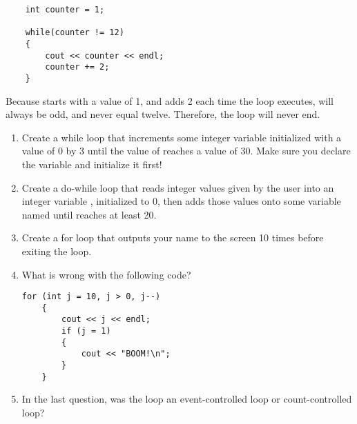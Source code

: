 \begin{lstlisting}
    int counter = 1;

    while(counter != 12)
    {
        cout << counter << endl;
        counter += 2;
    }
\end{lstlisting}

Because  starts with a value of 1, and adds 2 each time the loop executes,  will always be odd, and never equal twelve.
Therefore, the loop will never end.

\begin{enumerate}
\item Create a while loop that increments some integer variable  initialized with a value of 0 by 3 until the value of  reaches a value of 30.
Make sure you declare the variable and initialize it first! 

\item  Create a do-while loop that reads integer values given by the user into an integer variable , initialized to 0, then adds those values onto some variable named  until  reaches at least 20.

\item Create a for loop that outputs your name to the screen 10 times before exiting the loop.

\item What is wrong with the following code?
\begin{lstlisting}
for (int j = 10, j > 0, j--)
	{
		cout << j << endl;
		if (j = 1)
		{
			cout << "BOOM!\n";
		}
	}
\end{lstlisting}

\item In the last question, was the loop an event-controlled loop or count-controlled loop?
\end{enumerate}


